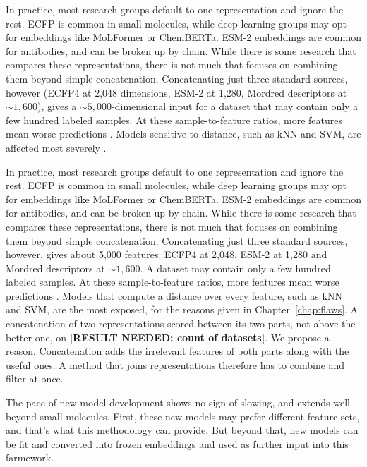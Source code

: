 In practice, most research groups default to one representation and ignore the rest. ECFP is common in small molecules, while deep learning groups may opt for embeddings like MoLFormer or ChemBERTa. ESM-2 embeddings are common for antibodies, and can be broken up by chain. While there is some research that compares these representations, there is not much that focuses on combining them beyond simple concatenation. Concatenating just three standard sources, however (ECFP4 at 2,048 dimensions, ESM-2 at 1,280, Mordred descriptors at ${\sim}1{,}600$), gives a ${\sim}5{,}000$-dimensional input for a dataset that may contain only a few hundred labeled samples. At these sample-to-feature ratios, more features mean worse predictions \citep{Hughes1968, Bellman1961}. Models sensitive to distance, such as kNN and SVM, are affected most severely \citep{FernandezDelgado2014}.

In practice, most research groups default to one representation and ignore the rest. ECFP is common in small molecules, while deep learning groups may opt for embeddings like MoLFormer or ChemBERTa. ESM-2 embeddings are common for antibodies, and can be broken up by chain. While there is some research that compares these representations, there is not much that focuses on combining them beyond simple concatenation. Concatenating just three standard sources, however, gives about 5,000 features: ECFP4 at 2,048, ESM-2 at 1,280 and Mordred descriptors at ${\sim}1{,}600$. A dataset may contain only a few hundred labeled samples. At these sample-to-feature ratios, more features mean worse predictions \citep{Hughes1968, Bellman1961}. Models that compute a distance over every feature, such as kNN and SVM, are the most exposed, for the reasons given in Chapter~\ref{chap:flaws}. A concatenation of two representations scored between its two parts, not above the better one, on \textbf{[RESULT NEEDED: count of datasets]}. We propose a reason. Concatenation adds the irrelevant features of both parts along with the useful ones. A method that joins representations therefore has to combine and filter at once.

The pace of new model development shows no sign of slowing, and extends well beyond small molecules. First, these new models may prefer different feature sets, and that's what this methodology can provide. But beyond that, new models can be fit and converted into frozen embeddings and used as further input into this farmework. 

